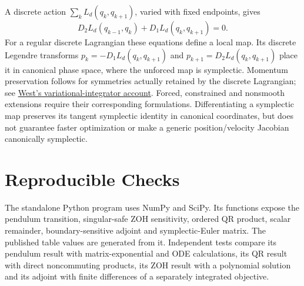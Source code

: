 A discrete action $\sum_k L_d(q_k,q_{k+1})$, varied with fixed endpoints, gives
\begin{equation}
D_2L_d(q_{k-1},q_k)+D_1L_d(q_k,q_{k+1})=0.
\end{equation}
For a regular discrete Lagrangian these equations define a local map. Its discrete Legendre transforms $p_k=-D_1L_d(q_k,q_{k+1})$ and $p_{k+1}=D_2L_d(q_k,q_{k+1})$ place it in canonical phase space, where the unforced map is symplectic. Momentum preservation follows for symmetries actually retained by the discrete Lagrangian; see \href{https://lagrangeweb.web.engr.illinois.edu/var_int/}{West's variational-integrator account}. Forced, constrained and nonsmooth extensions require their corresponding formulations. Differentiating a symplectic map preserves its tangent symplectic identity in canonical coordinates, but does not guarantee faster optimization or make a generic position/velocity Jacobian canonically symplectic.

\section{Reproducible Checks}

The standalone Python program uses NumPy and SciPy. Its functions expose the pendulum transition, singular-safe ZOH sensitivity, ordered QR product, scalar remainder, boundary-sensitive adjoint and symplectic-Euler matrix. The published table values are generated from it. Independent tests compare its pendulum result with matrix-exponential and ODE calculations, its QR result with direct noncommuting products, its ZOH result with a polynomial solution and its adjoint with finite differences of a separately integrated objective.

